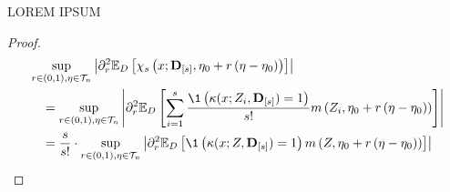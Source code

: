 \begin{boxD}
    \begin{lem}
        {\color{red} LOREM IPSUM}
    \end{lem}    
\end{boxD}

\begin{proof}
    \begin{equation}
        \begin{aligned}
            & \sup_{r \in(0,1), \eta \in \mathcal{T}_{n}}\left|
                \partial_r^2 \E_{D}\left[
                    \chi_{s}\left(x; \mathbf{D}_{[s]}, \eta_{0} + r\left(\eta-\eta_{0}\right)\right)
                \right]
            \right| \\
            & \quad = \sup_{r \in(0,1), \eta \in \mathcal{T}_{n}}\left|
                \partial_r^2 \E_{D}\left[
                    \sum_{i = 1}^{s}\frac{\1\left(\kappa(x; Z_{i}, \mathbf{D}_{[s]}) = 1\right)}{s!} 
                    m\left(Z_{i}, \eta_{0} + r\left(\eta-\eta_{0}\right)\right)
                \right]
            \right| \\
            & \quad = \frac{s}{s!} \cdot \sup_{r \in(0,1), \eta \in \mathcal{T}_{n}}\left|
                \partial_r^2 \E_{D}\left[
                    \1\left(\kappa(x; Z, \mathbf{D}_{[s]}) = 1\right) 
                    m\left(Z, \eta_{0} + r\left(\eta-\eta_{0}\right)\right)
                \right]
            \right| \\
        \end{aligned}
    \end{equation}
\end{proof}